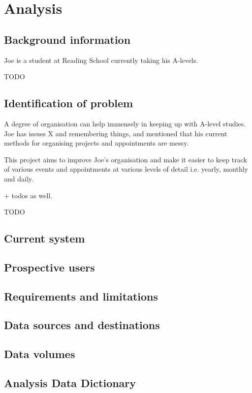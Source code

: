 \section{Analysis}

\subsection{Background information}

Joe is a student at Reading School currently taking his A-levels.

TODO

\subsection{Identification of problem}

A degree of organisation can help immensely in keeping up with A-level
studies. Joe has issues X and remembering things, and mentioned that his
current methods for organising projects and appointments are messy.

This project aims to improve Joe's organisation and make it easier to
keep track of various events and appointments at various levels of
detail i.e. yearly, monthly and daily.

+ todos as well.

TODO

\subsection{Current system}
\lipsum
\subsection{Prospective users}
\lipsum
\subsection{Requirements and limitations}
\lipsum
\subsection{Data sources and destinations}
\lipsum
\subsection{Data volumes}
\lipsum
\subsection{Analysis Data Dictionary}
\lipsum
